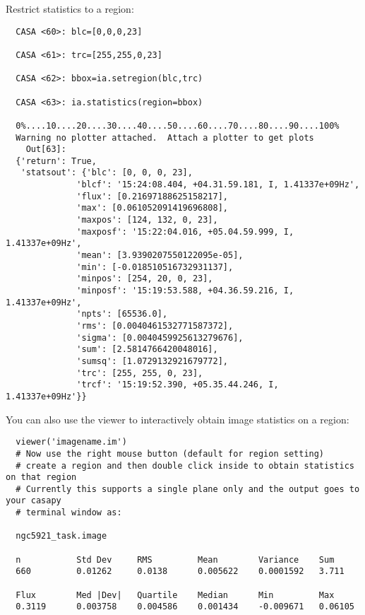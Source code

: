 Restrict statistics to a region:

\small
\begin{verbatim}
  CASA <60>: blc=[0,0,0,23]

  CASA <61>: trc=[255,255,0,23]

  CASA <62>: bbox=ia.setregion(blc,trc)

  CASA <63>: ia.statistics(region=bbox)

  0%....10....20....30....40....50....60....70....80....90....100%
  Warning no plotter attached.  Attach a plotter to get plots
    Out[63]: 
  {'return': True,
   'statsout': {'blc': [0, 0, 0, 23],
              'blcf': '15:24:08.404, +04.31.59.181, I, 1.41337e+09Hz',
              'flux': [0.21697188625158217],
              'max': [0.061052091419696808],
              'maxpos': [124, 132, 0, 23],
              'maxposf': '15:22:04.016, +05.04.59.999, I, 1.41337e+09Hz',
              'mean': [3.9390207550122095e-05],
              'min': [-0.018510516732931137],
              'minpos': [254, 20, 0, 23],
              'minposf': '15:19:53.588, +04.36.59.216, I, 1.41337e+09Hz',
              'npts': [65536.0],
              'rms': [0.0040461532771587372],
              'sigma': [0.0040459925613279676],
              'sum': [2.5814766420048016],
              'sumsq': [1.0729132921679772],
              'trc': [255, 255, 0, 23],
              'trcf': '15:19:52.390, +05.35.44.246, I, 1.41337e+09Hz'}}
\end{verbatim}
\normalsize

You can also use the viewer to interactively obtain image statistics on a region:

\small
\begin{verbatim}
  viewer('imagename.im')
  # Now use the right mouse button (default for region setting)
  # create a region and then double click inside to obtain statistics on that region
  # Currently this supports a single plane only and the output goes to your casapy 
  # terminal window as:

  ngc5921_task.image

  n           Std Dev     RMS         Mean        Variance    Sum
  660         0.01262     0.0138      0.005622    0.0001592   3.711     
  
  Flux        Med |Dev|   Quartile    Median      Min         Max
  0.3119      0.003758    0.004586    0.001434    -0.009671   0.06105   
\end{verbatim}
\normalsize

